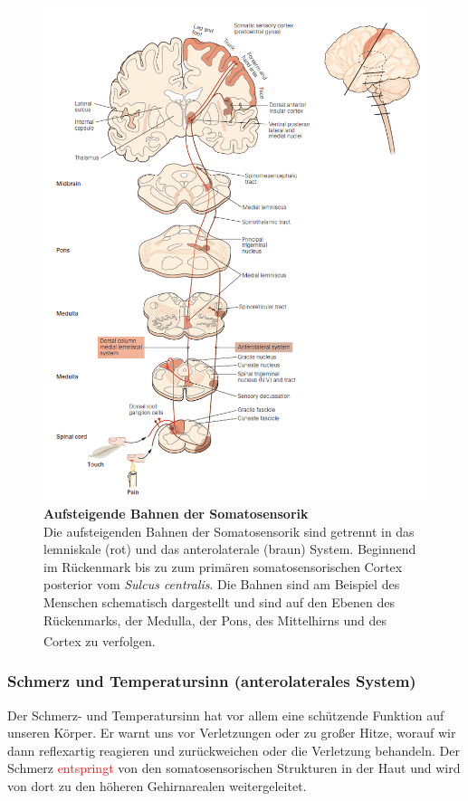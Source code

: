 \documentclass[12pt,a4paper,pdftex]{article}
\begin{document}
\begin{figure}[H]
    \centering
    \includegraphics{pictures/somatosensory/pathway_somatosensory2.png}
    \caption[Aufsteigende Bahnen der Somatosensorik]{\textbf{Aufsteigende Bahnen der Somatosensorik}\\
    Die aufsteigenden Bahnen der Somatosensorik sind getrennt in das lemniskale (rot) und das anterolaterale (braun) System. Beginnend im Rückenmark bis zu zum primären somatosensorischen Cortex posterior vom \textit{Sulcus centralis}. Die Bahnen sind am Beispiel des Menschen schematisch dargestellt und sind auf den Ebenen des Rückenmarks, der Medulla, der Pons, des Mittelhirns und des Cortex zu verfolgen.
    \textsuperscript{\cite[22]{kandel2013principles}}}
    \label{fig:somato_pathway}
\end{figure}

\newpage    
\subsubsection{Schmerz und Temperatursinn (anterolaterales System)}
Der Schmerz- und Temperatursinn hat vor allem eine schützende Funktion auf unseren Körper. Er warnt uns vor Verletzungen oder zu großer Hitze, worauf wir dann reflexartig reagieren und zurückweichen oder die Verletzung behandeln. Der Schmerz \textcolor{red}{entspringt} von den somatosensorischen Strukturen in der Haut und wird von dort zu den höheren Gehirnarealen weitergeleitet. 
\end{document}
